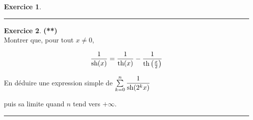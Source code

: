\documentclass[a4paper,11pt]{article}
\theoremstyle{definition}
\newtheorem{exo}{Exercice} %
\begin{document}
\begin{minipage}{1\linewidth}
\begin{minipage}[t]{0.48\linewidth}
\begin{exo}
			\centering
			\rule{1\linewidth}{0.6pt}
		\end{exo}
		
		\begin{exo}\textbf{(**)}\quad\\[0.2cm]
			Montrer que, pour tout $x \neq 0$,
			
			$$\dfrac{1}{\text{sh} (x)} = \dfrac{1}{ \text{th}( x)} - \dfrac{1}{ \text{th} \left(\frac{x}{2}\right)}$$
		
	 En déduire une expression simple de $\sum\limits_{k=0}^{n}\dfrac{1}{\text{sh} (2^kx)}$
	 
	 puis sa limite quand $n$ tend vers $+\infty$.
			
			
			\centering
			\rule{1\linewidth}{0.6pt}
		\end{exo}
		
		
		
	\end{minipage}
\end{minipage}
\end{document}

